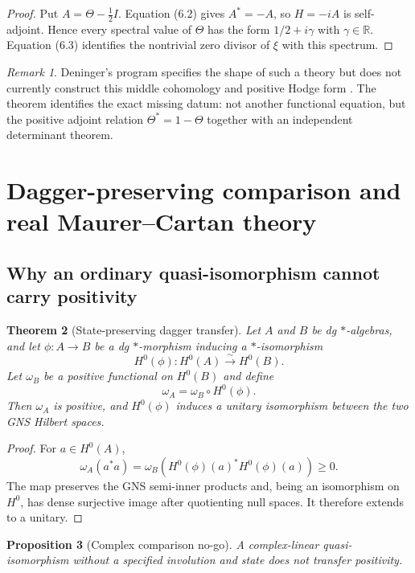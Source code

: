 \documentclass[11pt]{article}
\newtheorem{theorem}{Theorem}[section]
\newtheorem{proposition}[theorem]{Proposition}
\theoremstyle{definition}
\theoremstyle{remark}
\newtheorem{remark}[theorem]{Remark}
\newcommand{\RR}{\mathbb R}
\newcommand{\1}{\mathbf 1}
\begin{document}
\begin{proof}
Put $A=\Theta-\tfrac12I$.  Equation (6.2) gives $A^*=-A$, so $H=-iA$ is self-adjoint.  Hence every spectral value of $\Theta$ has the form $1/2+i\gamma$ with $\gamma\in\RR$.  Equation (6.3) identifies the nontrivial zero divisor of $\xi$ with this spectrum.
\end{proof}

\begin{remark}
Deninger's program specifies the shape of such a theory but does not currently construct this middle cohomology and positive Hodge form \cite{Deninger1998}.  The theorem identifies the exact missing datum: not another functional equation, but the positive adjoint relation $\Theta^*=1-\Theta$ together with an independent determinant theorem.
\end{remark}

\section{Dagger-preserving comparison and real Maurer--Cartan theory}

\subsection{Why an ordinary quasi-isomorphism cannot carry positivity}

\begin{theorem}[State-preserving dagger transfer]
Let $A$ and $B$ be dg $*$-algebras, and let $\phi:A\to B$ be a dg $*$-morphism inducing a $*$-isomorphism
\[
H^0(\phi):H^0(A)\xrightarrow{\sim}H^0(B).
\]
Let $\omega_B$ be a positive functional on $H^0(B)$ and define
\[
\omega_A=\omega_B\circ H^0(\phi).
\]
Then $\omega_A$ is positive, and $H^0(\phi)$ induces a unitary isomorphism between the two GNS Hilbert spaces.
\end{theorem}

\begin{proof}
For $a\in H^0(A)$,
\[
\omega_A(a^*a)
=
\omega_B(H^0(\phi)(a)^*H^0(\phi)(a))\geq0.
\]
The map preserves the GNS semi-inner products and, being an isomorphism on $H^0$, has dense surjective image after quotienting null spaces.  It therefore extends to a unitary.
\end{proof}

\begin{proposition}[Complex comparison no-go]
A complex-linear quasi-isomorphism without a specified involution and state does not transfer positivity.
\end{proposition}
\end{document}
